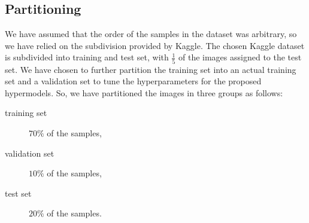 \subsection{Partitioning}
We have assumed that the order of the samples in the dataset was arbitrary, so we have relied on the subdivision provided by Kaggle. The chosen Kaggle dataset is subdivided into training and test set, with $\frac{1}{5}$ of the images assigned to the test set. We have chosen to further partition the training set into an actual training set and a validation set to tune the hyperparameters for the proposed hypermodels. So, we have partitioned the images in three groups as follows:
\begin{description}
    \item[training set] $70\%$ of the samples,
    \item[validation set] $10\%$ of the samples,  
    \item[test set] $20\%$ of the samples. 
\end{description}
